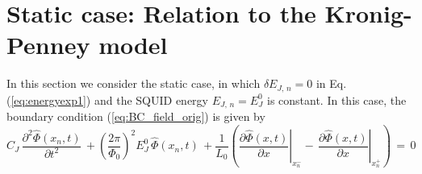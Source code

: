
\section{Static case: Relation to the Kronig-Penney model} 
\label{sec:kp}

\noindent
In this section we consider the static case, in which $\delta E_{J,\,n} = 0$ in Eq.\,(\ref{eq:energyexp1})
and the SQUID energy $E_{J,\,n} = E_J^0$ is constant. In this case, the boundary condition 
(\ref{eq:BC_field_orig}) is given by
%
\begin{equation}\label{eq:BC_field_static_orig}
C_{J} \, \frac{\partial^2 \hat{\Phi}(x_n, t)}{\partial t^2} \, + 
\left(\frac{2 \pi}{\Phi_{0}}\right)^{2} E_J^0 \, \hat{\Phi}(x_n, t) \, + 
\frac{1}{L_{0}}\left(\left.\frac{\partial \hat{\Phi}(x, t)}{\partial x}\right|_{x_n^{-}}
- \, \left.\frac{\partial \hat{\Phi}(x,t)}{\partial x}\right|_{x_n^{+}}\right) \, = \, 0
\end{equation}


